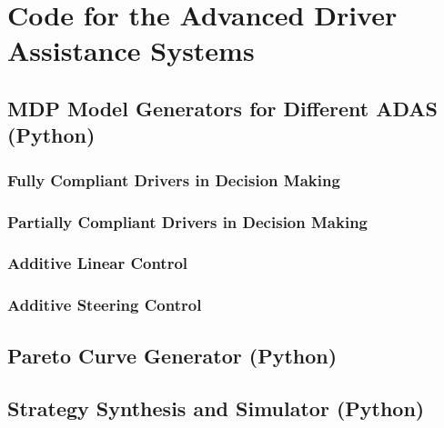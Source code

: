 \chapter{Code for the Advanced Driver Assistance Systems}

\section{MDP Model Generators for Different ADAS (Python)}

\subsection{Fully Compliant Drivers in Decision Making}
\label{sec:adas_pdm}



\subsection{Partially Compliant Drivers in Decision Making}
\label{sec:adas_idm}



\subsection{Additive Linear Control}
\label{sec:adas_lc}



\subsection{Additive Steering Control}
\label{sec:adas_sc}



\section{Pareto Curve Generator (Python)}



\section{Strategy Synthesis and Simulator (Python)}
\label{sec:strat_synth_and_sym}

